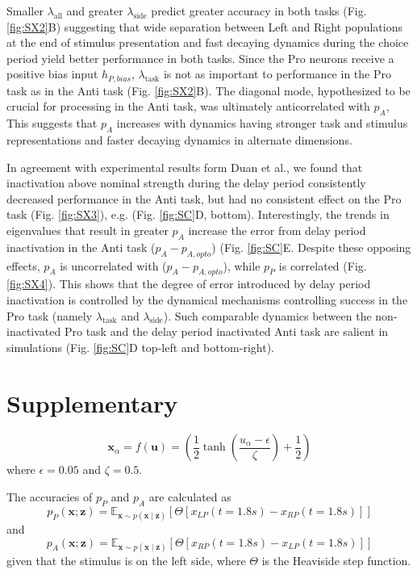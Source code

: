 \documentclass[11pt]{article}
\begin{document}
Smaller $\lambda_{\text{all}}$ and greater $\lambda_{\text{side}}$ predict greater accuracy in both tasks (Fig. \ref{fig:SX2}B) suggesting that wide separation between Left and Right populations at the end of stimulus presentation and fast decaying dynamics during the choice period yield better performance in both tasks.
Since the Pro neurons receive a positive bias input $h_{P, bias}$, $\lambda_{\text{task}}$ is not as important to performance in the Pro task as in the Anti task (Fig. \ref{fig:SX2}B).
The diagonal mode, hypothesized to be crucial for processing in the Anti task, was ultimately anticorrelated with $p_A$, 
This suggests that $p_A$ increases with dynamics having stronger task and stimulus representations and faster decaying dynamics in alternate dimensions.

In agreement with experimental results form Duan et al., we found that inactivation above nominal strength during the delay period consistently decreased performance in the Anti task, but had no consistent effect on the Pro task (Fig. \ref{fig:SX3}), e.g. (Fig. \ref{fig:SC}D, bottom).
Interestingly, the trends in eigenvalues that result in greater $p_A$ increase the error from delay period inactivation in the Anti task ($p_A - p_{A, opto}$) (Fig. \ref{fig:SC}E.
Despite these opposing effects, $p_A$ is uncorrelated with ($p_A - p_{A, opto}$), while $p_P$ is correlated (Fig. \ref{fig:SX4}).
This shows that the degree of error introduced by delay period inactivation is controlled by the dynamical mechanisms controlling success in the Pro task (namely $\lambda_{\text{task}}$ and $\lambda_{\text{side}}$).
Such comparable dynamics between the non-inactivated Pro task and the delay period inactivated Anti task are salient in simulations (Fig. \ref{fig:SC}D top-left and bottom-right).



\section{Supplementary}\label{methods_SC}
\begin{equation}
\mathbf{x}_\alpha = f(\mathbf{u}) = \left(\frac{1}{2}\tanh\left(\frac{u_\alpha - \epsilon}{\zeta}\right)+ \frac{1}{2} \right)
\end{equation}
where $\epsilon = 0.05$ and $\zeta = 0.5$.  

The accuracies of $p_P$ and $p_A$ are calculated as
\begin{equation}
p_P(\mathbf{x}; \mathbf{z}) = \mathbb{E}_{\mathbf{x} \sim p(\mathbf{x} \mid \mathbf{z})}\left[\Theta[x_{LP}(t=1.8s) - x_{RP}(t=1.8s)]\right]
\end{equation}
and 
\begin{equation}
p_A(\mathbf{x}; \mathbf{z}) = \mathbb{E}_{\mathbf{x} \sim p(\mathbf{x} \mid \mathbf{z})}\left[\Theta[x_{RP}(t=1.8s) - x_{LP}(t=1.8s)]\right]
\end{equation}
given that the stimulus is on the left side, where $\Theta$ is the Heaviside step function.
\end{document}

